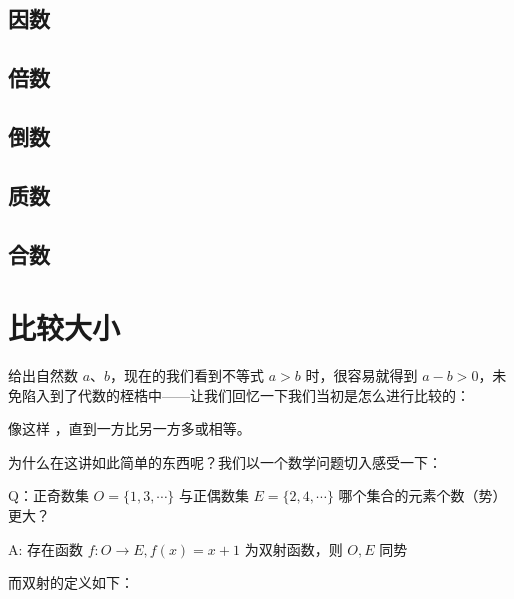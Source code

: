 \subsection{因数}

\subsection{倍数}

\subsection{倒数}

\subsection{质数}

\subsection{合数}

\section{比较大小}

给出自然数 $a$、$b$，现在的我们看到不等式 $a > b$ 时，很容易就得到 $a - b > 0$，未免陷入到了代数的桎梏中——让我们回忆一下我们当初是怎么进行比较的：

\begin{center}
\end{center}

像这样 ，直到一方比另一方多或相等。

为什么在这讲如此简单的东西呢？我们以一个数学问题切入感受一下：

Q：正奇数集 $O = \{1, 3, \cdots\}$ 与正偶数集 $E = \{2, 4, \cdots\}$ 哪个集合的元素个数（势）更大？

A: 存在函数 $f: O \to E, f(x) = x + 1$ 为双射函数，则 $O, E$ 同势

而双射的定义如下：

